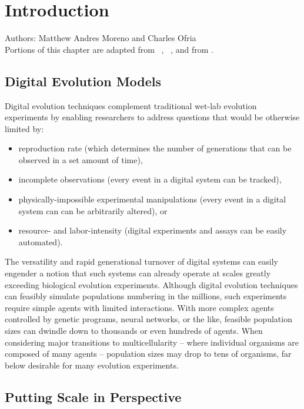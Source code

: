 \chapter{Introduction}
\label{ch:introduction}

\noindent
Authors: Matthew Andres Moreno and Charles Ofria \\
Portions of this chapter are adapted from ~\citep{moreno2019toward}, ~\citep{moreno2020practical}, and from \citep{moreno2020profiling}.

\section{Digital Evolution Models}

Digital evolution techniques complement traditional wet-lab evolution experiments by enabling researchers to address questions that would be otherwise limited by:
\begin{itemize}
\item reproduction rate (which determines the number of generations that can be observed in a set amount of time),
\item incomplete observations (every event in a digital system can be tracked),
\item physically-impossible experimental manipulations (every event in a digital system can can be arbitrarily altered), or
\item resource- and labor-intensity (digital experiments and assays can be easily automated).
\end{itemize}
The versatility and rapid generational turnover of digital systems can easily engender a notion that such systems can already operate at scales greatly exceeding biological evolution experiments.
Although digital evolution techniques can feasibly simulate populations numbering in the millions, such experiments require simple agents with limited interactions.
With more complex agents controlled by genetic programs, neural networks, or the like, feasible population sizes can dwindle down to thousands or even hundreds of agents.
When considering major transitions to multicellularity -- where individual organisms are composed of many agents -- population sizes may drop to tens of organisms, far below desirable for many evolution experiments.

\section{Putting Scale in Perspective}

